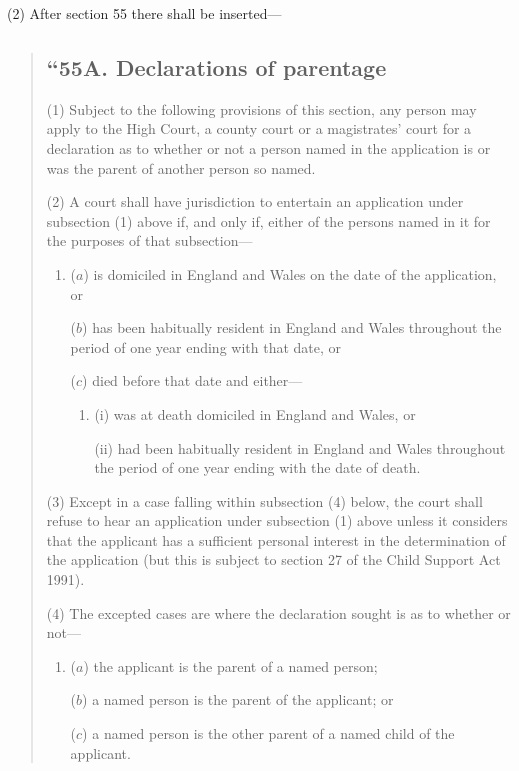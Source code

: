 \documentclass[12pt,a4paper]{article}
\begin{document}
(2) After section 55 there shall be inserted—
\begin{quotation}
\subsection*{“55A. Declarations of parentage}

(1) Subject to the following provisions of this section, any person may apply to the High Court, a county court or a magistrates' court for a declaration as to whether or not a person named in the application is or was the parent of another person so named.

(2) A court shall have jurisdiction to entertain an application under subsection (1)  above if, and only if, either of the persons named in it for the purposes of that subsection—
\begin{enumerate}\item[]
($a$) is domiciled in England and Wales on the date of the application, or

($b$) has been habitually resident in England and Wales throughout the period of one year ending with that date, or

($c$) died before that date and either—
\begin{enumerate}\item[]
(i) was at death domiciled in England and Wales, or

(ii) had been habitually resident in England and Wales throughout the period of one year ending with the date of death.
\end{enumerate}
\end{enumerate}

(3) Except in a case falling within subsection (4)  below, the court shall refuse to hear an application under subsection (1)  above unless it considers that the applicant has a sufficient personal interest in the determination of the application (but this is subject to section 27 of the Child Support Act 1991).

(4) The excepted cases are where the declaration sought is as to whether or not—
\begin{enumerate}\item[]
($a$) the applicant is the parent of a named person;

($b$) a named person is the parent of the applicant; or

($c$) a named person is the other parent of a named child of the applicant.
\end{enumerate}


\end{quotation}
\end{document}
